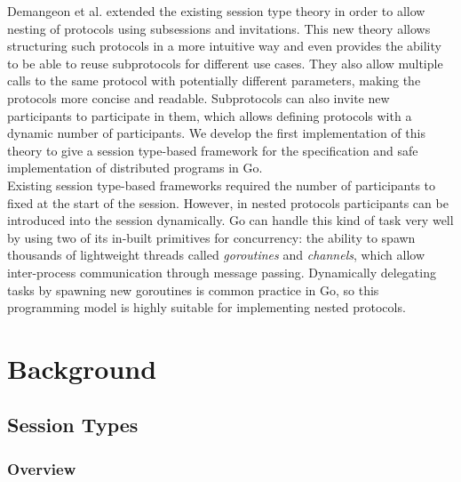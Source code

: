 \documentclass[12pt,twoside]{report}
\begin{document}
Demangeon et al.\cite{nestedprotocols} extended the existing session type theory in order to allow nesting of protocols using subsessions and invitations. This new theory allows structuring such protocols in a more intuitive way and even provides the ability to be able to reuse subprotocols for different use cases. They also allow multiple calls to the same protocol with potentially different parameters, making the protocols more concise and readable. Subprotocols can also invite new participants to participate in them, which allows defining protocols with a dynamic number of participants. We develop the first implementation of this theory to give a session type-based framework for the specification and safe implementation of distributed programs in Go.\\

Existing session type-based frameworks required the number of participants to fixed at the start of the session. However, in nested protocols participants can be introduced into the session dynamically. Go can handle this kind of task very well by using two of its in-built primitives for concurrency\cite{godocs}: the ability to spawn thousands of lightweight threads called \textit{goroutines} and \textit{channels}, which allow inter-process communication through message passing. Dynamically delegating tasks by spawning new goroutines is common practice in Go, so this programming model is highly suitable for implementing nested protocols.



\chapter{Background}

\section{Session Types}
\subsection{Overview}
\end{document}

